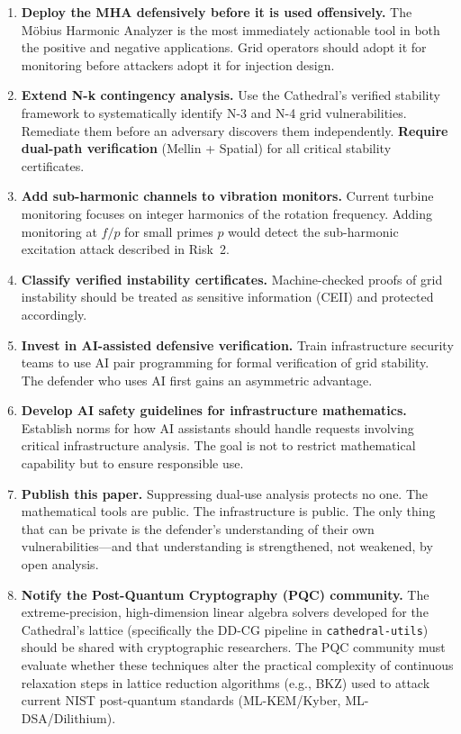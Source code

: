 \documentclass[11pt,a4paper]{article}
\begin{document}
\begin{enumerate}
  \item \textbf{Deploy the MHA defensively before it is used
    offensively.} The M\"obius Harmonic Analyzer is the most
    immediately actionable tool in both the positive and negative
    applications. Grid operators should adopt it for monitoring
    before attackers adopt it for injection design.

  \item \textbf{Extend N-k contingency analysis.} Use the Cathedral's
    verified stability framework to systematically identify N-3 and
    N-4 grid vulnerabilities. Remediate them before an adversary
    discovers them independently. \textbf{Require dual-path
    verification} (Mellin + Spatial) for all critical stability
    certificates.

  \item \textbf{Add sub-harmonic channels to vibration monitors.}
    Current turbine monitoring focuses on integer harmonics of the
    rotation frequency. Adding monitoring at $f/p$ for small primes
    $p$ would detect the sub-harmonic excitation attack described
    in Risk~2.

  \item \textbf{Classify verified instability certificates.}
    Machine-checked proofs of grid instability should be treated
    as sensitive information (CEII) and protected accordingly.

  \item \textbf{Invest in AI-assisted defensive verification.}
    Train infrastructure security teams to use AI pair programming
    for formal verification of grid stability. The defender who
    uses AI first gains an asymmetric advantage.

  \item \textbf{Develop AI safety guidelines for infrastructure
    mathematics.} Establish norms for how AI assistants should
    handle requests involving critical infrastructure analysis.
    The goal is not to restrict mathematical capability but to
    ensure responsible use.

  \item \textbf{Publish this paper.} Suppressing dual-use analysis
    protects no one. The mathematical tools are public. The
    infrastructure is public. The only thing that can be private is
    the defender's understanding of their own vulnerabilities---and
    that understanding is strengthened, not weakened, by open
    analysis.

  \item \textbf{Notify the Post-Quantum Cryptography (PQC)
    community.} The extreme-precision, high-dimension linear
    algebra solvers developed for the Cathedral's lattice
    (specifically the DD-CG pipeline in \texttt{cathedral-utils})
    should be shared with cryptographic researchers. The PQC
    community must evaluate whether these techniques alter the
    practical complexity of continuous relaxation steps in
    lattice reduction algorithms (e.g., BKZ) used to attack
    current NIST post-quantum standards (ML-KEM/Kyber,
    ML-DSA/Dilithium).
\end{enumerate}
\end{document}
